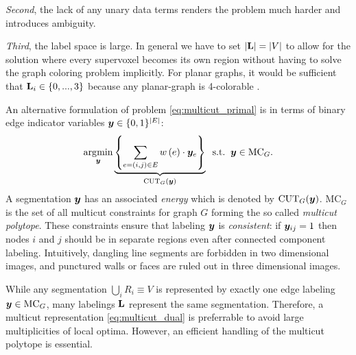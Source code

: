 \noindent
\emph{Second}, the lack of any unary data terms renders the problem much harder
and introduces ambiguity.

\noindent
\emph{Third}, the label space is large.
In general we have to set
$|\mathbf{L}| = |V|$ to allow for the solution
where every supervoxel becomes its own region
without having to solve the graph coloring problem implicitly.
For planar graphs, it would be sufficient that $\mathbf{L}_i \in \{0,...,3\}$
because any planar-graph is 4-colorable \cite{appel_1977_4color}.
%


An alternative formulation of problem \eqref{eq:multicut_primal}
is in terms of binary edge indicator variables
$\boldsymbol y \in \{0,1\}^{| E |}$:
\begin{align}
\argmin_{\y}
\underbrace{%
    \left\{
        \sum_{e=(i,j) \in E} \w \left(e\right) \cdot \y_{e}
    \right\}%
}_{%
    \CUT_G(\y)%
}%
\;\;\text{s.t.}\;\;\y \in \MC_G.
\label{eq:multicut_dual}
\end{align}
%
A segmentation $\boldsymbol y$ has an associated \emph{energy}
which is denoted by $\text{CUT}_G(\boldsymbol y)$.
%
$\text{MC}_G$ is the set of all multicut
constraints \cite{chopra_1993_mp} for graph $G$ forming
the so called \emph{multicut polytope}.
These constraints ensure that labeling $\boldsymbol y$ is
\emph{consistent}:
if $\boldsymbol y_{ij}=1$ then nodes $i$ and $j$ should be in
separate regions even after connected component labeling. Intuitively,
dangling line segments are forbidden in two dimensional images,
and punctured walls or faces are ruled out in three dimensional images.

While any segmentation $\bigcup_{i} R_i \equiv V$ is represented by exactly one
edge labeling $\boldsymbol y\in\text{MC}_G$, many labelings $\mathbf{L}$ represent the same segmentation.
Therefore, a multicut representation \eqref{eq:multicut_dual} is preferrable
to avoid large multiplicities of local optima.
%
However, an efficient handling of the multicut polytope is
essential.






